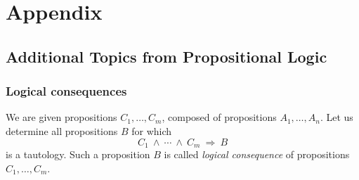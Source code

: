 \documentclass[11pt,paper=b5,footinclude,headinclude]{scrbook} %
\def\inn {{~\wedge~}}
\def\sledi {{~\Rightarrow~}}
\theoremstyle{remark}
\theoremstyle{definition} %
\theoremstyle{theorem} %
\begin{document}

\appendix
\cleardoublepage\part*{Appendix}
\chapter{Additional Topics from Propositional Logic}
\section{Logical consequences}

We are given propositions $C_1,\ldots, C_m$, composed of propositions $A_1,\ldots, A_n$.
Let us determine all propositions $B$ for which $$C_1\inn\cdots\inn C_m\sledi B$$
is a tautology. Such a proposition $B$ is called  {\em logical consequence}
of propositions $C_1,\ldots, C_m$.
\end{document}
